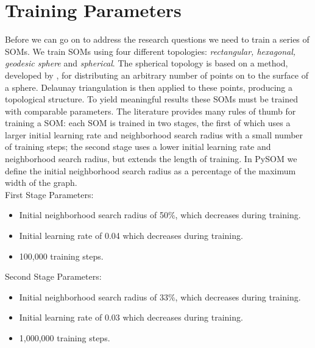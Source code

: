 


\section{Training Parameters}
\label{meth:train}
Before we can go on to address the research questions we need to train a
series of SOMs.  We train SOMs using four different topologies:
\emph{rectangular, hexagonal, geodesic sphere} and \emph{spherical}.  The spherical
topology is based on a method, developed by \cite{Rakhmanov94}, for
distributing an arbitrary number of points on to the surface of a sphere.
Delaunay triangulation is then applied to these points, producing a
topological structure.  To yield meaningful results these SOMs must be trained
with comparable parameters.  The literature provides many rules of thumb for
training a SOM: each SOM is trained in two stages, the first of which uses a larger
initial learning rate and neighborhood search radius with a small number of
training steps; the second stage uses a lower initial learning rate and
neighborhood search radius, but extends the length of training. In PySOM we
define the initial neighborhood search radius as a percentage of the maximum
width of the graph.
\\
First Stage Parameters:
\begin{itemize}
  \item Initial neighborhood search radius of 50\%, which decreases during training. 
  \item Initial learning rate of 0.04 which decreases during training.
  \item 100,000 training steps.
\end{itemize}
Second Stage Parameters:
\begin{itemize}
  \item Initial neighborhood search radius of 33\%, which decreases during training. 
  \item Initial learning rate of 0.03 which decreases during training.
  \item 1,000,000 training steps.
\end{itemize}

